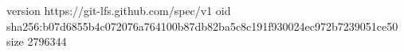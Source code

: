 version https://git-lfs.github.com/spec/v1
oid sha256:b07d6855b4c072076a764100b87db82ba5c8c191f930024ec972b7239051ce50
size 2796344
